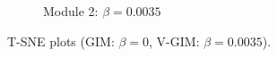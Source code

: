 \begin{figure}[h]
\begin{subfigure}{0.45\linewidth}
		\caption{Module 2: $\beta=0.0035$}
		\label{fig:t-sne-kld0-module-2}
	\end{subfigure}
	\caption{T-SNE plots (GIM: $\beta=0$, V-GIM: $\beta=0.0035$).}
	\label{fig:four_tsne_plots}
\end{figure}